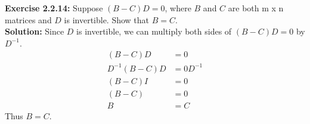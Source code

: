 \documentclass{amsart}
\begin{document}
\noindent\textbf{Exercise 2.2.14: } Suppose $(B-C)D = 0$, where $B$ and $C$ are both m x n matrices and $D$ is invertible. Show that $B = C$.\\
\noindent \textbf{Solution: } Since $D$ is invertible, we can multiply both sides of $(B-C)D = 0$ by $D^{-1}$. 
\begin{align}
(B-C)D &= 0\\
D^{-1}(B-C)D &= 0D^{-1}\\
(B-C)I &= 0\\
(B-C) &= 0\\
B &= C
\end{align}
Thus $B = C$.
\vspace{1in}
\end{document}
